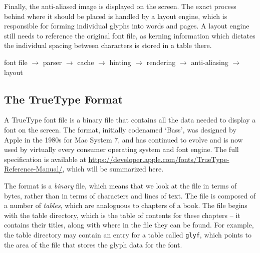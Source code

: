 \documentclass{report}
\begin{document}
Finally, the anti-aliased image is displayed on the screen. The exact process
behind where it should be placed is handled by a layout engine, which is
responsible for forming individual glyphs into words and pages. A layout engine
still needs to reference the original font file, as kerning information which
dictates the individual spacing between characters is stored in a table there.

font file $\rightarrow$ parser $\rightarrow$ cache $\rightarrow$ hinting $\rightarrow$
rendering $\rightarrow$ anti-aliasing $\rightarrow$ layout


\subsection{The TrueType Format}
A TrueType font file is a binary file that contains all the data needed to
display a font on the screen. The format, initially codenamed `Bass', was
designed by Apple in the 1980s for Mac System 7, and has continued to evolve and
is now used by virtually every consumer operating system and font engine. The
full specification is available at
\url{https://developer.apple.com/fonts/TrueType-Reference-Manual/}, which will
be summarized here.

The format is a \textit{binary} file, which means that we look at the file in
terms of bytes, rather than in terms of characters and lines of text. The file
is composed of a number of \textit{tables}, which are analoguous to chapters of
a book. The file begins with the table directory, which is the table of contents
for these chapters -- it contains their titles, along with where in the file
they can be found. For example, the table directory may contain an entry for a
table called \texttt{glyf}, which points to the area of the file that stores the
glyph data for the font. 
\end{document}
